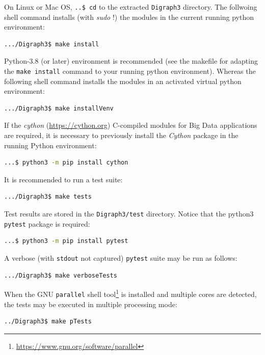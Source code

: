 On Linux or Mac OS, \texttt{..\$ cd} to the extracted \texttt{Digraph3} directory. The follwoing shell command installs (with \emph{sudo} !) the \Digraph modules in the current running python environment:
\begin{lstlisting}[language=sh, backgroundcolor=\color{White},numbers=none]
  .../Digraph3$ make install
\end{lstlisting}

Python-3.8 (or later) environment is recommended (see the makefile for adapting the \texttt{make install} command to your running python environment). Whereas the following shell command installs the \Digraph modules in an activated virtual python environment:
\begin{lstlisting}[language=sh, backgroundcolor=\color{White}, numbers=none]
  .../Digraph3$ make installVenv
\end{lstlisting}


If the \emph{cython} (\href{https://cython.org}{https://cython.org}) C-compiled modules for Big Data applications are required, it is necessary to previously install the \emph{Cython} package in the running Python environment:
\begin{lstlisting}[language=sh, backgroundcolor=\color{White}, numbers=none]
  ...$ python3 -m pip install cython
\end{lstlisting}

It is recommended to run a test suite:
\begin{lstlisting}[language=sh, backgroundcolor=\color{White}, numbers=none]
  .../Digraph3$ make tests
\end{lstlisting}

Test results are stored in the \texttt{Digraph3/test} directory. Notice that the python3 \texttt{pytest} package is required:
\begin{lstlisting}[language=sh, backgroundcolor=\color{White}, numbers=none]
  ...$ python3 -m pip install pytest
\end{lstlisting}

A verbose (with \texttt{stdout} not captured) \texttt{pytest} suite may be run as follows:
\begin{lstlisting}[language=sh, backgroundcolor=\color{White}, numbers=none]
  .../Digraph3$ make verboseTests
\end{lstlisting}

When the GNU \texttt{parallel} shell tool\footnote{\href{https://www.gnu.org/software/parallel}{https://www.gnu.org/software/parallel}} is installed and multiple cores are detected, the tests may be executed in multiple processing mode:
\begin{lstlisting}[language=sh, backgroundcolor=\color{White}, numbers=none]
  ../Digraph3$ make pTests
\end{lstlisting}

